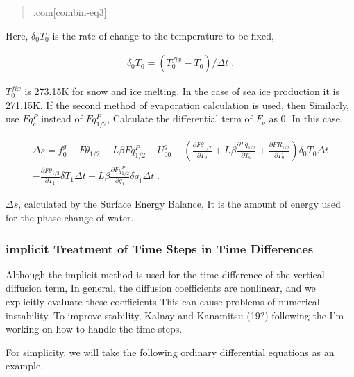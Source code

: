 \begin{quote}
\protect\hypertarget{combin-eq3}{}{\cleaner.com{[}combin-eq3{]}}
\end{quote}

Here, \(\delta_0 T_0\) is the rate of change to the temperature to be
fixed,

\begin{eqnarray}
   \delta_0 T_0 = ( T_0^{fix} - T_0 ) / \Delta t \; .
\end{eqnarray}

\(T_0^{fix}\) is 273.15K for snow and ice melting, In the case of sea
ice production it is 271.15K. If the second method of evaporation
calculation is used, then Similarly, use \(Fq^P_c\) instead of
\(Fq^P_{1/2}\), Calculate the differential term of \(F_q\) as 0. In this
case,

\begin{eqnarray}
\Delta s  =  f_0^g - F\theta_{1/2} - L \beta Fq^P_{1/2} - U_{00}^g
          -  \left(\frac{\partial F\theta_{1/2}}{\partial T_0}
                + L \beta \frac{\partial Fq_{1/2}}{\partial T_0}
                + \frac{\partial FR_{1/2}}{\partial T_0} \right) \delta_0 T_0 \Delta t
                 \\
          -  \frac{\partial F\theta_{1/2}}{\partial T_1} \delta T_1 \Delta t
                - L \beta \frac{\partial Fq^P_{1/2}}{\partial q_1} \delta q_1 \Delta t \; .
\end{eqnarray}

\(\Delta s\), calculated by the Surface Energy Balance, It is the amount
of energy used for the phase change of water.

\hypertarget{implicit-treatment-of-time-steps-in-time-differences}{%
\subsubsection{implicit Treatment of Time Steps in Time
Differences}\label{implicit-treatment-of-time-steps-in-time-differences}}

Although the implicit method is used for the time difference of the
vertical diffusion term, In general, the diffusion coefficients are
nonlinear, and we explicitly evaluate these coefficients This can cause
problems of numerical instability. To improve stability, Kalnay and
Kanamitsu (19?) following the I'm working on how to handle the time
steps.

For simplicity, we will take the following ordinary differential
equations as an example.


